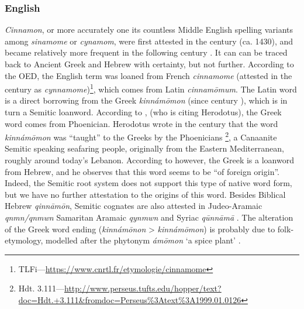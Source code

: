
\subsubsection{English}
\label{sec:cinnamon_names_en}



\textit{Cinnamon}, or more accurately one its countless Middle English spelling variants among \textit{sinamome} or \textit{cynamom}, were first attested in the  century (ca. 1430), and became relatively more frequent in the following  century . It can can be traced back to Ancient Greek and Hebrew with certainty, but not further. According to the \gls{OED}, the English term was loaned from French \textit{cinnamome} (attested in the  century as \textit{cynnamome})\footnote{\gls{TLFi}---\url{https://www.cnrtl.fr/etymologie/cinnamome}}, which comes from Latin \textit{cinnamōmum}. The Latin word is a direct borrowing from the Greek  \textit{kinnámōmon} (since  century \BC), which is in turn a Semitic loanword. According to \textcite[701]{beekes_etymological_2010}, (who is citing Herodotus), the Greek word comes from Phoenician. Herodotus wrote in the  century \BC{} that the word \textit{kinnámōmon} was ``taught'' to the Greeks by the Phoenicians \parencite[139]{herodotus_herodotus_1921}\footnote{Hdt. 3.111---\url{http://www.perseus.tufts.edu/hopper/text?doc=Hdt.+3.111&fromdoc=Perseus\%3Atext\%3A1999.01.0126}}, a Canaanite Semitic speaking seafaring people, originally from the Eastern Mediterranean, roughly around today’s Lebanon. According to \textcite[585]{klein_comprehensive_1987} however, the Greek is a loanword from Hebrew, and he observes that this word seems to be ``of foreign origin''. Indeed, the Semitic root system does not support this type of native word form, but we have no further attestation to the origins of this word. Besides Biblical Hebrew 
\textit{qinnāmōn}, Semitic cognates are also attested in Judeo-Aramaic \textit{qnmn/qnmwn} Samaritan Aramaic \textit{qynmwn} and Syriac \textit{qūnnāmā} \parencite{rosol_early_2018}. The alteration of the Greek word ending (\textit{kinnámōnon} > \textit{kinnámōmon}) is probably due to folk-etymology, modelled after the \gls{phytonym}  \textit{ámōmon} `a spice plant' \parencites{beekes_etymological_2010, klein_comprehensive_1987}. 
    
